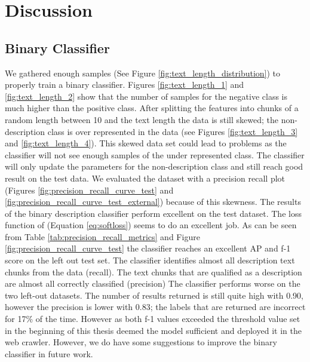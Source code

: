 \documentclass[a4paper, 12pt, oneside]{book} %
\begin{document}
\newpage
\section{Discussion} \label{par:discussion}

\subsection{Binary Classifier}
We gathered enough samples (See Figure \ref{fig:text_length_distribution}) to properly train a binary classifier.
Figures \ref{fig:text_length_1} and \ref{fig:text_length_2} show that the number of samples for the negative class is much higher than the positive class. 
After splitting the features into chunks of a random length between 10 and the text length the data is still skewed; the non-description class is over represented in the data (see Figures \ref{fig:text_length_3} and \ref{fig:text_length_4}). 
This skewed data set could lead to problems as the classifier will not see enough samples of the under represented class. 
The classifier will only update the parameters for the non-description class and still reach good result on the test data.
We evaluated the dataset with a precision recall plot (Figures \ref{fig:precision_recall_curve_test} and \ref{fig:precision_recall_curve_test_external}) because of this skewness.
The results of the binary description classifier perform excellent on the test dataset. 
The loss function of \textcite{reed_training_2015} (Equation \ref{eq:softloss}) seems to do an excellent job.
As can be seen from Table \ref{tab:precision_recall_metrics} and Figure \ref{fig:precision_recall_curve_test} the classifier reaches an excellent AP and f-1 score on the left out test set.
The classifier identifies almost all description text chunks from the data (recall).
The text chunks that are qualified as a description are almost all correctly classified (precision)
The classifier performs worse on the two left-out datasets.
The number of results returned is still quite high with 0.90, however the precision is lower with 0.83; the labels that are returned are incorrect for 17\% of the time.
However as both f-1 values exceeded the threshold value set in the beginning of this thesis deemed the model sufficient and deployed it in the web crawler.
However, we do have some suggestions to improve the binary classifier in future work.
\end{document}
